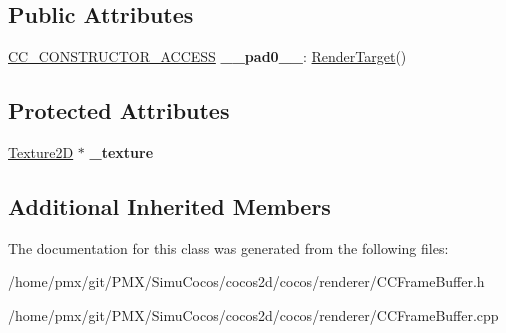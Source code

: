 \subsection*{Public Attributes}
\begin{DoxyCompactItemize}
\item 
\mbox{\label{classexperimental_1_1RenderTarget_a2b3bd2345509d81f8366d09be84af735}} 
\hyperlink{_2cocos2d_2cocos_2base_2ccConfig_8h_a25ef1314f97c35a2ed3d029b0ead6da0}{C\+C\+\_\+\+C\+O\+N\+S\+T\+R\+U\+C\+T\+O\+R\+\_\+\+A\+C\+C\+E\+SS} {\bfseries \+\_\+\+\_\+pad0\+\_\+\+\_\+}\+: \hyperlink{classexperimental_1_1RenderTarget}{Render\+Target}()
\end{DoxyCompactItemize}
\subsection*{Protected Attributes}
\begin{DoxyCompactItemize}
\item 
\mbox{\label{classexperimental_1_1RenderTarget_ad032a7571f6b6f9488acaaceafe23073}} 
\hyperlink{classTexture2D}{Texture2D} $\ast$ {\bfseries \+\_\+texture}
\end{DoxyCompactItemize}
\subsection*{Additional Inherited Members}


The documentation for this class was generated from the following files\+:\begin{DoxyCompactItemize}
\item 
/home/pmx/git/\+P\+M\+X/\+Simu\+Cocos/cocos2d/cocos/renderer/C\+C\+Frame\+Buffer.\+h\item 
/home/pmx/git/\+P\+M\+X/\+Simu\+Cocos/cocos2d/cocos/renderer/C\+C\+Frame\+Buffer.\+cpp\end{DoxyCompactItemize}
